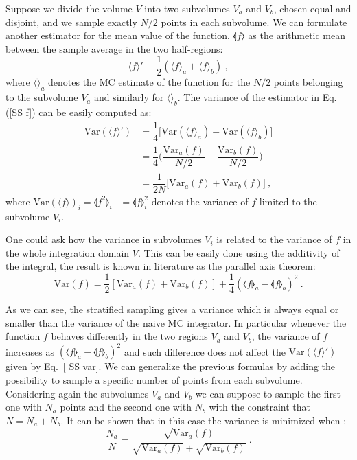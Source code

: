 \documentclass[../main/main.tex]{subfiles}
\begin{document}
Suppose we divide the volume $V$ into two subvolumes $V_a$  and $V_b$, chosen equal and disjoint, and we sample exactly $N/2$ points in each subvolume. We can formulate another estimator for the mean value of the function, $\llangle f \rrangle $ as the arithmetic mean between the sample average
in the two half-regions:
\begin{equation}
	\label {SS f}
	\langle f  \rangle ' \equiv \frac{1}{2} (  \langle f \rangle_a + \langle f \rangle_b ) \ ,
\end{equation}
where $\langle \rangle_a$ denotes the MC estimate of the function for the $N/2$ points belonging to the subvolume $V_a$ and similarly for $\langle \rangle_b$.
The variance of the estimator in Eq.(\ref{SS f}) can be easily computed as:
\begin{eqnarray}
	\text{Var}(\langle f \rangle ') &= \dfrac{1}{4}  \big[  \text{Var}(\langle f \rangle_a) +\text{Var}(\langle f \rangle_b)  \big]  \\
	&= \dfrac{1}{4} \bigg(  \dfrac{\text{Var}_a(f)}{N/2} +\dfrac{\text{Var}_b(f)}{N/2} \bigg) \\
	&= \dfrac{1}{2N} \big[ \text{Var}_a(f) + \text{Var}_b(f)\big] \label{var_stratified} \ ,
	\label{ SS var}
\end{eqnarray}
where $\text{Var}(\langle f \rangle)_{i} = \llangle f^2 \rrangle_i - = \llangle f \rrangle^2_i$ denotes the variance of $f$ limited to the subvolume $V_i$.

One could ask how the variance in subvolumes $V_i$ is related to the variance of $f$ in the whole integration domain $V$. This can be easily done using the additivity of the integral, the result is known in literature as the parallel axis theorem:
\begin{equation}
	\text{Var}(f) = \frac{1}{2} [ \text{Var}_a(f) + \text{Var}_b(f)] + \frac{1}{4} ( 
	\llangle f \rrangle_a - \llangle f \rrangle_b)^2 \ .
\end{equation}

As we can see, the stratified sampling gives a variance which is always equal or smaller than the variance of the naive MC integrator. In particular whenever the function $f$ behaves differently in 
the two regions $V_a$ and $V_b$, the variance of $f$ increases as $ ( 
\llangle f \rrangle_a - \llangle f \rrangle_b)^2$ and such difference does not affect the $\text{Var}(\langle f \rangle')$ given by Eq.~\ref{ SS var}.
\newline
We can generalize the previous formulas by adding the possibility to sample a specific number of 
points from each subvolume. Considering again the subvolumes $V_a$ and $V_b$ we can suppose 
to sample the first one with $N_a$ points and the second one with $N_b$ with the constraint that $N = N_a + N_b$. 
\newline
It can be shown that in this case the variance is minimized when \cite{Press:1989vk}:
\begin{equation}
	\frac{N_a}{N} = \frac{\sqrt{\text{Var}_a(f)}}{\sqrt{\text{Var}_a(f)}+
		\sqrt{\text{Var}_b(f)}} \ .
\end{equation}
\end{document}
